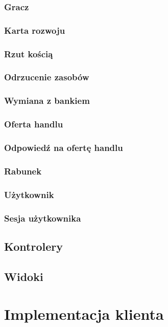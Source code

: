 \documentclass[a4paper,12pt]{article}
\begin{document}

\subsubsection{Gracz}
\subsubsection{Karta rozwoju}
\subsubsection{Rzut kością}
\subsubsection{Odrzucenie zasobów}
\subsubsection{Wymiana z bankiem}
\subsubsection{Oferta handlu}
\subsubsection{Odpowiedź na ofertę handlu}
\subsubsection{Rabunek}
\subsubsection{Użytkownik}
\subsubsection{Sesja użytkownika}

\subsection{Kontrolery}

\subsection{Widoki}

\clearpage

\section{Implementacja klienta}


\clearpage



\end{document}
